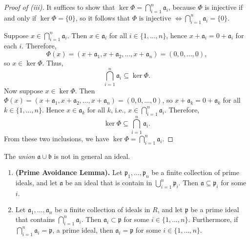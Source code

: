 \begin{proof}[Proof of (iii)]
It suffices to show that \(\ker \Phi = \bigcap_{i=1}^n \mathfrak{a}_i\), because \(\Phi\) is injective if and only if \(\ker \Phi = \{0\}\), so it follows that
\(\Phi \text{ is injective } \iff \bigcap_{i=1}^n \mathfrak{a}_i = \{0\}.\)

Suppose \(x \in \bigcap_{i=1}^n \mathfrak{a}_i\). Then \(x \in \mathfrak{a}_i\) for all \(i \in \{1, \dots, n\}\), hence \(x + \mathfrak{a}_i = 0 + \mathfrak{a}_i\) for each \(i\). Therefore,
\[
\Phi(x) = (x + \mathfrak{a}_1, x + \mathfrak{a}_2, \dots, x + \mathfrak{a}_n) = (0, 0, \ldots, 0),
\]
so \(x \in \ker \Phi\). Thus,
\[
\bigcap_{i=1}^n \mathfrak{a}_i \subseteq \ker \Phi.
\]
Now suppose \(x \in \ker \Phi\). Then \(\Phi(x) = (x + \mathfrak{a}_1, x + \mathfrak{a}_2, \dots, x + \mathfrak{a}_n) = (0, 0, \ldots, 0)\), so \(x + \mathfrak{a}_k = 0 + \mathfrak{a}_k\) for all \(k \in \{1, \dots, n\}\). Hence \(x \in \mathfrak{a}_k\) for all \(k\), i.e., \(x \in \bigcap_{i=1}^n \mathfrak{a}_i\). Therefore,
\[
\ker \Phi \subseteq \bigcap_{i=1}^n \mathfrak{a}_i.
\]
From these two inclusions, we have \(\ker \Phi = \bigcap_{i=1}^n \mathfrak{a}_i\).
\end{proof}
The \emph{union} \(\mathfrak{a} \cup \mathfrak{b}\) is not in general an ideal.
\begin{proposition}\label{prop:primeavoidance}
    \begin{enumerate}[label=\roman*), leftmargin=*]
        \item \textbf{(Prime Avoidance Lemma).} Let \(\mathfrak{p}_1, \ldots, \mathfrak{p}_n\) be a finite collection of prime ideals, and let \(\mathfrak{a}\) be an ideal that is contain in \(\bigcup_{i=1}^n \mathfrak{p}_i\). Then  \(\mathfrak{a} \subseteq \mathfrak{p}_i\) for some \(i\).
        \item Let \(\mathfrak{a}_1, \ldots, \mathfrak{a}_n\) be a finite collection of ideals in \(R\), and let  \(\mathfrak{p}\) be a prime ideal that contains \(\bigcap_{i=1}^n \mathfrak{a}_i\). Then \(\mathfrak{a}_i \subset \mathfrak{p}\) for some \(i \in \{1, \ldots, n\}\). Furthermore, if \(\bigcap_{i=1}^n \mathfrak{a}_i = \mathfrak{p}\), a prime ideal, then \(\mathfrak{a}_i = \mathfrak{p}\) for some \(i \in \{1, \ldots, n\}\).
    \end{enumerate} 
\end{proposition}
